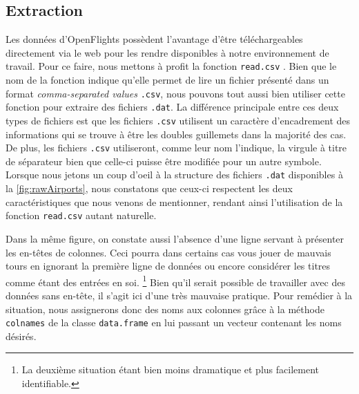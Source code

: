 \subsection{Extraction}
	\label{subsec:extraction}

Les données d'OpenFlights possèdent l'avantage d'être téléchargeables directement via le web pour les rendre disponibles à notre environnement de travail. Pour ce faire, nous mettons à profit la fonction \texttt{read.csv} \cite{Rfunction:read.csv}. Bien que le nom de la fonction indique qu'elle permet de lire un fichier présenté dans un format \emph{comma-separated values} \texttt{.csv}, nous pouvons tout aussi bien utiliser cette fonction pour extraire des fichiers \texttt{.dat}. La différence principale entre ces deux types de fichiers est que les fichiers \texttt{.csv} utilisent un caractère d'encadrement des informations qui se trouve à être les doubles guillemets dans la majorité des cas. De plus, les fichiers \texttt{.csv} utiliseront, comme leur nom l'indique, la virgule à titre de séparateur bien que celle-ci puisse être modifiée pour un autre symbole.\cite{CSVDAT} Lorsque nous jetons un coup d'oeil à la structure des fichiers \texttt{.dat} disponibles à la \autoref{fig:rawAirports}, nous constatons que ceux-ci respectent les deux caractéristiques que nous venons de mentionner, rendant ainsi l'utilisation de la fonction \texttt{read.csv} autant naturelle. \\


Dans la même figure, on constate aussi l'absence d'une ligne servant à présenter les en-têtes de colonnes. Ceci pourra dans certains cas vous jouer de mauvais tours en ignorant la première ligne de données ou encore considérer les titres comme étant des entrées en soi. \footnote{La deuxième situation étant bien moins dramatique et plus facilement identifiable.} Bien qu'il serait possible de travailler avec des données sans en-tête, il s'agit ici d'une très mauvaise pratique. Pour remédier à la situation, nous assignerons donc des noms aux colonnes grâce à la méthode \texttt{colnames} de la classe \texttt{data.frame} en lui passant un vecteur contenant les noms désirés. \\

